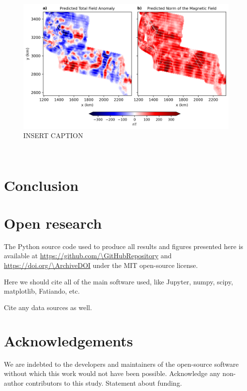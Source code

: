 \begin{figure}[!h]
\centering
\includegraphics[width=1\linewidth]{paper/figures/real_grid_pred.png}
\caption{
    INSERT CAPTION
}
\label{fig:real_grid_pred}
\end{figure}
\


\section{Conclusion}

\lipsum[1]


\section{Open research}

The Python source code used to produce all results and figures presented here
is available at \url{https://github.com/\GitHubRepository} and
\url{https://doi.org/\ArchiveDOI} under the MIT open-source license.

Here we should cite all of the main software used, like Jupyter, numpy, scipy,
matplotlib, Fatiando, etc.

Cite any data sources as well.

\section{Acknowledgements}

We are indebted to the developers and maintainers of the open-source software
without which this work would not have been possible.
Acknowledge any non-author contributors to this study.
Statement about funding.

